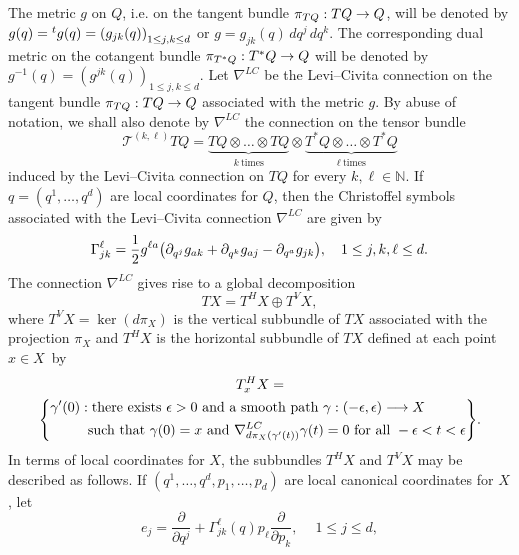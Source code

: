 \documentclass[10pt]{amsart}
\theoremstyle{definition}\newtheorem{defi}[theo]{Definition}\newtheorem{rema}[theo]{Remark}\newtheorem{exam}[theo]{Example}\newtheorem{exem}[theo]{Example}\newtheorem{nota}[theo]{Notation}
\newcommand{\N}{\mathbb{N}}
\newcommand{\clT}{\mathcal{T}}
\newcommand{\p}{\partial}
\let\originalleft\left
\let\originalright\right
\renewcommand{\left}{\mathopen{}\mathclose\bgroup\originalleft}
\renewcommand{\right}{\aftergroup\egroup\originalright}
\renewcommand*{\to}{\mathchoice{\longrightarrow}{\rightarrow}{\rightarrow}{\rightarrow}}
\begin{document}
The metric $g$ on $Q$, i.e. on the tangent bundle $\pi_{TQ}: TQ \to Q$, will be denoted by $g(q) = {}^{t}g(q) = \left(g_{jk}(q) \right)_{1 \le j, k \le d}$ or $g = g_{jk}(q) \, dq^j \, dq^k$. The corresponding dual metric on the cotangent bundle $\pi_{T^* Q}: T^* Q \to Q$ will be denoted by $g^{-1}(q) = (g^{jk}(q))_{1 \le j, k \le d}$. Let $\nabla^{LC}$ be the Levi--Civita connection on the tangent bundle $\pi_{TQ}: TQ \to Q$ associated with the metric $g$. By abuse of notation, we shall also denote by $\nabla^{LC}$ the connection on the tensor bundle
\begin{equation}
\clT^{(k,\ell)} TQ = \underbrace{TQ \otimes \dots \otimes TQ}_{k \ \text{times}} \otimes \underbrace{T^* Q \otimes \dots \otimes T^* Q}_{\ell \ \text{times}}
\end{equation}
induced by the Levi--Civita connection on $TQ$ for every $k, \ell \in \N$. If $q = (q^1, \dots, q^d)$ are local coordinates for $Q$, then the Christoffel symbols associated with the Levi--Civita connection $\nabla^{LC}$ are given by
\begin{equation}
\Gamma_{jk}^\ell = \frac{1}{2} g^{\ell a} \left(\p_{q^j} g_{a k} + \p_{q^k} g_{a j} - \p_{q^a} g_{jk} \right), \quad 1 \le j, k, \ell \le d.
\end{equation}
The connection $\nabla^{LC}$ gives rise to a global decomposition
\begin{equation}\label{horizontal_vertical_decomposition}
TX = T^H X \oplus T^V X,
\end{equation}
where $T^V X = \ker{(d\pi_X)}$ is the vertical subbundle of $TX$ associated with the projection $\pi_X$ and $T^H X$ is the horizontal subbundle of $TX$ defined at each point $x \in X$~by
\begin{multline}
T^H_x X =\\
\left\{
\begin{aligned}
\gamma'(0): & \; \text{there exists } \epsilon>0\text{ and a smooth path } \gamma: (-\epsilon, \epsilon) \to X  \\
& \text{such that }\gamma(0) = x\text{ and }\nabla^{LC}_{d\pi_X(\gamma'(t))} \gamma(t) = 0\text{ for all }-\epsilon<t<\epsilon
\end{aligned}
\right\}.
\end{multline}
In terms of local coordinates for $X$, the subbundles $T^HX$ and $T^V X$ may be described as follows. If $(q^1, \dots, q^d, p_1, \dots, p_d)$ are local canonical coordinates for $X$, let
\begin{equation}\label{definition_e_j}
e_j = \frac{\p}{\p q^j} + \Gamma^\ell_{jk}(q) p_\ell \frac{\p}{\p p_k}, \quad \ 1 \le j \le d,
\end{equation}
\end{document}
